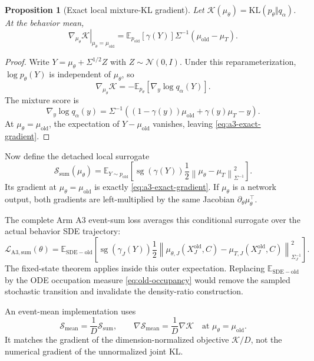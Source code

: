\documentclass[11pt,a4paper]{article}
\newcommand{\E}{\mathbb{E}}
\newcommand{\N}{\mathcal{N}}
\newcommand{\KL}{\mathrm{KL}}
\newcommand{\norm}[1]{\left\lVert #1 \right\rVert}
\newcommand{\sg}{\operatorname{sg}}
\theoremstyle{plain}
\newtheorem{proposition}[theorem]{Proposition}
\theoremstyle{definition}
\begin{document}
\begin{proposition}[Exact local mixture-KL gradient]
\label{prop:a3-exact-gradient}
Let
$\mathcal K(\mu_\theta)=\KL(p_\theta\Vert q_\alpha)$.  At the behavior mean,
\begin{equation}
\left.
\nabla_{\mu_\theta}\mathcal K
\right|_{\mu_\theta=\mu_{\mathrm{old}}}
=
\E_{p_{\mathrm{old}}}[\gamma(Y)]
\Sigma^{-1}(\mu_{\mathrm{old}}-\mu_T).
\label{eq:a3-exact-gradient}
\end{equation}
\end{proposition}

\begin{proof}
Write $Y=\mu_\theta+\Sigma^{1/2}Z$ with $Z\sim\N(0,I)$.  Under this
reparameterization, $\log p_\theta(Y)$ is independent of $\mu_\theta$, so
\[
\nabla_{\mu_\theta}\mathcal K
=-\E_{p_\theta}[\nabla_y\log q_\alpha(Y)].
\]
The mixture score is
\[
\nabla_y\log q_\alpha(y)
=
\Sigma^{-1}\!\left(
  (1-\gamma(y))\mu_{\mathrm{old}}
  +\gamma(y)\mu_T-y
\right).
\]
At $\mu_\theta=\mu_{\mathrm{old}}$, the expectation of
$Y-\mu_{\mathrm{old}}$ vanishes, leaving \eqref{eq:a3-exact-gradient}.
\end{proof}

Now define the detached local surrogate
\begin{equation}
\mathcal S_{\mathrm{sum}}(\mu_\theta)
=
\E_{Y\sim p_{\mathrm{old}}}\!\left[
  \sg(\gamma(Y))
  \frac12
  \norm{\mu_\theta-\mu_T}_{\Sigma^{-1}}^2
\right].
\label{eq:a3-local-surrogate}
\end{equation}
Its gradient at $\mu_\theta=\mu_{\mathrm{old}}$ is exactly
\eqref{eq:a3-exact-gradient}.  If $\mu_\theta$ is a network output, both gradients are
left-multiplied by the same Jacobian $\partial_\theta\mu_\theta^\top$.

The complete Arm A3 event-sum loss averages this conditional surrogate over the actual behavior
SDE trajectory:
\begin{equation}
\mathcal L_{\mathrm{A3,sum}}(\theta)
=
\E_{\mathrm{SDE-old}}\!\left[
  \sg(\gamma_J(Y))
  \frac12
  \norm{
    \mu_{\theta,J}(X_J^{\mathrm{old}},C)
    -\mu_{T,J}(X_J^{\mathrm{old}},C)
  }_{\Sigma_J^{-1}}^2
\right].
\label{eq:a3-arm-loss}
\end{equation}
The fixed-state theorem applies inside this outer expectation.  Replacing
$\E_{\mathrm{SDE-old}}$ by the ODE occupation measure \eqref{eq:old-occupancy} would remove the
sampled stochastic transition and invalidate the density-ratio construction.

An event-mean implementation uses
\begin{equation}
\mathcal S_{\mathrm{mean}}=\frac{1}{D}\mathcal S_{\mathrm{sum}},
\qquad
\nabla\mathcal S_{\mathrm{mean}}
=
\frac1D\nabla\mathcal K
\quad\text{at }\mu_\theta=\mu_{\mathrm{old}}.
\label{eq:a3-mean-gradient}
\end{equation}
It matches the gradient of the dimension-normalized objective $\mathcal K/D$, not the numerical
gradient of the unnormalized joint KL.
\end{document}
